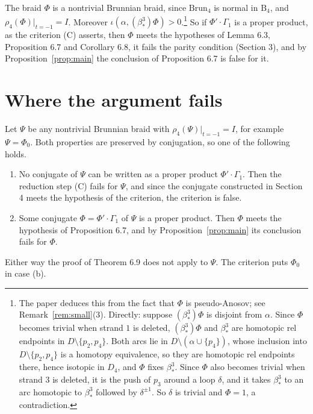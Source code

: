 \documentclass[11pt]{amsart}
\theoremstyle{remark}
\newcommand{\B}{\mathrm{B}}
\newcommand{\Brun}{\mathrm{Brun}}
\newcommand{\bs}{\beta^3_*}
\newcommand{\at}{\big|_{t=-1}}
\begin{document}
The braid $\Phi$ is a nontrivial Brunnian braid, since $\Brun_4$ is normal in $\B_4$, and $\rho_4(\Phi)\at=I$. Moreover $\iota(\alpha,(\bs)\Phi)>0$.\footnote{The paper deduces this from the fact that $\Phi$ is pseudo-Anosov; see Remark~\ref{rem:small}(3). Directly: suppose $(\bs)\Phi$ is disjoint from $\alpha$. Since $\Phi$ becomes trivial when strand $1$ is deleted, $(\bs)\Phi$ and $\bs$ are homotopic rel endpoints in $D\setminus\{p_2,p_4\}$. Both arcs lie in $D\setminus(\alpha\cup\{p_4\})$, whose inclusion into $D\setminus\{p_2,p_4\}$ is a homotopy equivalence, so they are homotopic rel endpoints there, hence isotopic in $D_4$, and $\Phi$ fixes $\bs$. Since $\Phi$ also becomes trivial when strand $3$ is deleted, it is the push of $p_3$ around a loop $\delta$, and it takes $\bs$ to an arc homotopic to $\bs$ followed by $\delta^{\pm1}$. So $\delta$ is trivial and $\Phi=1$, a contradiction.} So if $\Phi'\cdot\Gamma_1$ is a proper product, as the criterion (C) asserts, then $\Phi$ meets the hypotheses of Lemma 6.3, Proposition 6.7 and Corollary 6.8, it fails the parity condition (Section 3), and by Proposition~\ref{prop:main} the conclusion of Proposition 6.7 is false for it.

\section{Where the argument fails}

Let $\Psi$ be any nontrivial Brunnian braid with $\rho_4(\Psi)\at=I$, for example $\Psi=\Phi_0$. Both properties are preserved by conjugation, so one of the following holds.
\begin{enumerate}
\item[(a)] No conjugate of $\Psi$ can be written as a proper product $\Phi'\cdot\Gamma_1$. Then the reduction step (C) fails for $\Psi$, and since the conjugate constructed in Section 4 meets the hypothesis of the criterion, the criterion is false.
\item[(b)] Some conjugate $\Phi=\Phi'\cdot\Gamma_1$ of $\Psi$ is a proper product. Then $\Phi$ meets the hypothesis of Proposition 6.7, and by Proposition~\ref{prop:main} its conclusion fails for $\Phi$.
\end{enumerate}
Either way the proof of Theorem 6.9 does not apply to $\Psi$. The criterion puts $\Phi_0$ in case (b).
\end{document}
